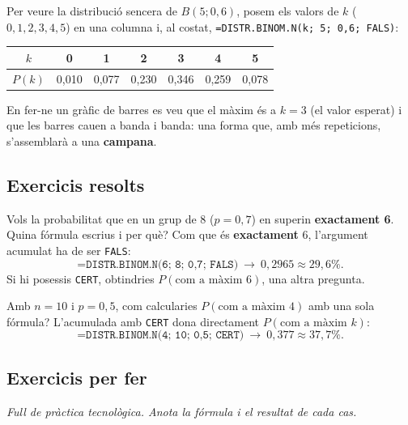\begin{exemple}
Per veure la distribució sencera de $B(5;0,6)$, posem els valors de $k$ ($0,1,2,3,4,5$)
en una columna i, al costat, \texttt{=DISTR.BINOM.N(k;\ 5;\ 0,6;\ FALS)}:
\begin{center}
\renewcommand{\arraystretch}{1.2}
\begin{tabular}{c c c c c c c}
\toprule
$k$ & 0 & 1 & 2 & 3 & 4 & 5 \\
\midrule
$P(k)$ & 0,010 & 0,077 & 0,230 & 0,346 & 0,259 & 0,078 \\
\bottomrule
\end{tabular}
\end{center}
En fer-ne un gràfic de barres es veu que el màxim és a $k=3$ (el valor esperat) i que les
barres cauen a banda i banda: una forma que, amb més repeticions, s'assemblarà a una
\textbf{campana}.
\end{exemple}

\subsection{Exercicis resolts}

\begin{exresolt}
Vols la probabilitat que en un grup de $8$ ($p=0,7$) en superin \textbf{exactament 6}.
Quina fórmula escrius i per què?
\solucio
Com que és \textbf{exactament} 6, l'argument acumulat ha de ser \texttt{FALS}:
\[
\texttt{=DISTR.BINOM.N(6;\ 8;\ 0,7;\ FALS)}\ \to\ 0,2965\approx 29,6\%.
\]
Si hi posessis \texttt{CERT}, obtindries $P(\text{com a màxim }6)$, una altra pregunta.
\end{exresolt}

\begin{exresolt}
Amb $n=10$ i $p=0,5$, com calcularies $P(\text{com a màxim }4)$ amb una sola fórmula?
\solucio
L'acumulada amb \texttt{CERT} dona directament $P(\text{com a màxim }k)$:
\[
\texttt{=DISTR.BINOM.N(4;\ 10;\ 0,5;\ CERT)}\ \to\ 0,377\approx 37,7\%.
\]
\end{exresolt}

\subsection{Exercicis per fer}

\noindent\textit{Full de pràctica tecnològica. Anota la fórmula i el resultat de cada
cas.}

